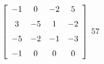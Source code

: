 {$\left[ \begin {array}{cccc} -1&0&-2&5\\\noalign{\medskip}3&-5&1&-2
\\\noalign{\medskip}-5&-2&-1&-3\\\noalign{\medskip}-1&0&0&0\end {array} \right]$} 
{$57$}



  

